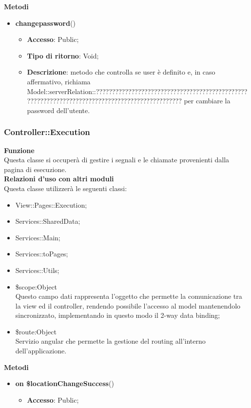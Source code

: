 {{\begin{itemize}
    \end{itemize}
	\textbf{Metodi}
	\begin{itemize}
		\item \textbf{changepassword}()
		\begin{itemize}
			\item \textbf{Accesso}: Public;
			\item \textbf{Tipo di ritorno}: Void;
			\item \textbf{Descrizione}: metodo che controlla se user è definito e, in caso affermativo, richiama Model::\-serverRelation::\-??????????????????????????????????????????????????????????????????????????????????????????????? per cambiare la password dell'utente.
		\end{itemize}
	\end{itemize}
}
\subsubsection{Controller::Execution}{
	\textbf{Funzione}\\
	\indent Questa classe si occuperà di gestire i segnali e le chiamate provenienti dalla pagina di esecuzione.\\
	\textbf{Relazioni d'uso con altri moduli}\\
	\indent Questa classe utilizzerà le seguenti classi:
	\begin{itemize}
		\item View::Pages::Execution;
		\item Services::SharedData;
		\item Services::Main;
		\item Services::toPages;
		\item Services::Utils;
		\item \$scope:Object\\
			\indent Questo campo dati rappresenta l’oggetto che permette la comunicazione tra la view ed il controller, rendendo possibile l’accesso al model mantenendolo sincronizzato, implementando in questo modo il 2-way data binding;
		\item \$route:Object\\
			\indent Servizio angular che permette la gestione del routing all'interno dell'applicazione.
	\end{itemize}
	\textbf{Metodi}
	\begin{itemize}
		\item \textbf{on \$locationChangeSuccess}()
		\begin{itemize}
			\item \textbf{Accesso}: Public;

\end{itemize}
\end{itemize}}}
